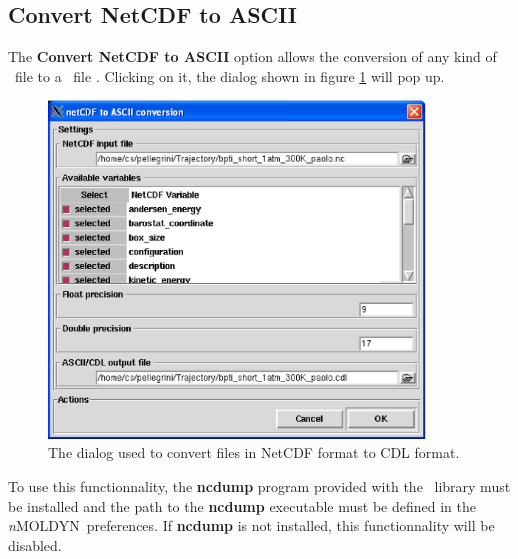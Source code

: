 \documentclass[a4paper,11pt]{report}
\newcommand{\NMOLDYN}{\textit{n}MOLDYN}
\begin{document}
\subsection{Convert NetCDF to ASCII}
\label{convert_netcdf_ascii}
The \textbf{Convert NetCDF to ASCII} option allows the conversion of any kind of \NetCDF\ file to a \CDL\ file \cite{CDL}. 
Clicking on it, the dialog shown in figure \ref{fig:convert_netcdf_ascii} will pop up. 
\begin{figure}[h!]
\begin{center}
\includegraphics[width=10cm]{Figures/convert_netcdf_ascii.eps}
\end{center}
\caption[The NetCDF to ASCII conversion dialog]{The dialog used to convert files in NetCDF format to CDL format.}
\label{fig:convert_netcdf_ascii}
\end{figure}   

To use this functionnality, the \textbf{ncdump} program \cite{ncdump} provided with the \NetCDF\ library must be installed and the path to the 
\textbf{ncdump} executable must be defined in the \NMOLDYN\ preferences. If \textbf{ncdump} is not installed, 
this functionnality will be disabled.
\end{document}

